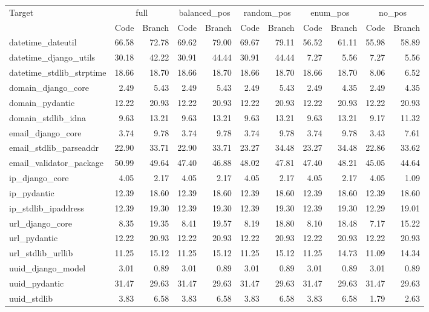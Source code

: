 \begin{tabular}{lrrrrrrrrrr}
\toprule
Target & \multicolumn{2}{c}{full} & \multicolumn{2}{c}{balanced\_pos} & \multicolumn{2}{c}{random\_pos} & \multicolumn{2}{c}{enum\_pos} & \multicolumn{2}{c}{no\_pos} \\
 & Code & Branch & Code & Branch & Code & Branch & Code & Branch & Code & Branch \\
\midrule
datetime\_dateutil & 66.58 & 72.78 & 69.62 & 79.00 & 69.67 & 79.11 & 56.52 & 61.11 & 55.98 & 58.89 \\
datetime\_django\_utils & 30.18 & 42.22 & 30.91 & 44.44 & 30.91 & 44.44 & 7.27 & 5.56 & 7.27 & 5.56 \\
datetime\_stdlib\_strptime & 18.66 & 18.70 & 18.66 & 18.70 & 18.66 & 18.70 & 18.66 & 18.70 & 8.06 & 6.52 \\
domain\_django\_core & 2.49 & 5.43 & 2.49 & 5.43 & 2.49 & 5.43 & 2.49 & 4.35 & 2.49 & 4.35 \\
domain\_pydantic & 12.22 & 20.93 & 12.22 & 20.93 & 12.22 & 20.93 & 12.22 & 20.93 & 12.22 & 20.93 \\
domain\_stdlib\_idna & 9.63 & 13.21 & 9.63 & 13.21 & 9.63 & 13.21 & 9.63 & 13.21 & 9.17 & 11.32 \\
email\_django\_core & 3.74 & 9.78 & 3.74 & 9.78 & 3.74 & 9.78 & 3.74 & 9.78 & 3.43 & 7.61 \\
email\_stdlib\_parseaddr & 22.90 & 33.71 & 22.90 & 33.71 & 23.27 & 34.48 & 23.27 & 34.48 & 22.86 & 33.62 \\
email\_validator\_package & 50.99 & 49.64 & 47.40 & 46.88 & 48.02 & 47.81 & 47.40 & 48.21 & 45.05 & 44.64 \\
ip\_django\_core & 4.05 & 2.17 & 4.05 & 2.17 & 4.05 & 2.17 & 4.05 & 2.17 & 4.05 & 1.09 \\
ip\_pydantic & 12.39 & 18.60 & 12.39 & 18.60 & 12.39 & 18.60 & 12.39 & 18.60 & 12.39 & 18.60 \\
ip\_stdlib\_ipaddress & 12.39 & 19.30 & 12.39 & 19.30 & 12.39 & 19.30 & 12.39 & 19.30 & 12.29 & 19.01 \\
url\_django\_core & 8.35 & 19.35 & 8.41 & 19.57 & 8.19 & 18.80 & 8.10 & 18.48 & 7.17 & 15.22 \\
url\_pydantic & 12.22 & 20.93 & 12.22 & 20.93 & 12.22 & 20.93 & 12.22 & 20.93 & 12.22 & 20.93 \\
url\_stdlib\_urllib & 11.25 & 15.12 & 11.25 & 15.12 & 11.25 & 15.12 & 11.25 & 14.73 & 11.09 & 14.34 \\
uuid\_django\_model & 3.01 & 0.89 & 3.01 & 0.89 & 3.01 & 0.89 & 3.01 & 0.89 & 3.01 & 0.89 \\
uuid\_pydantic & 31.47 & 29.63 & 31.47 & 29.63 & 31.47 & 29.63 & 31.47 & 29.63 & 31.47 & 29.63 \\
uuid\_stdlib & 3.83 & 6.58 & 3.83 & 6.58 & 3.83 & 6.58 & 3.83 & 6.58 & 1.79 & 2.63 \\
\bottomrule
\end{tabular}
